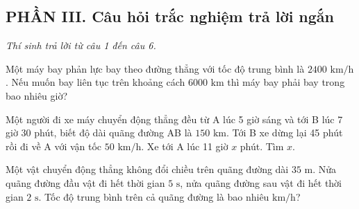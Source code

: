 \setcounter{ex}{0}
\subsection*{PHẦN III. Câu hỏi trắc nghiệm trả lời ngắn}
\textit{Thí sinh trả lời từ câu 1 đến câu 6.}

\begin{ex} Một máy bay phản lực bay theo đường thẳng với tốc độ trung bình là $2400\text{ km/h}$. Nếu muốn bay liên tục trên khoảng cách $6000\text{ km}$ thì máy bay phải bay trong bao nhiêu giờ?

\par{}
\end{ex}

\begin{ex} Một người đi xe máy chuyển động thẳng đều từ A lúc 5 giờ sáng và tới B lúc 7 giờ 30 phút, biết độ dài quãng đường AB là $150\text{ km}$. Tới B xe dừng lại 45 phút rồi đi về A với vận tốc $50\text{ km/h}$. Xe tới A lúc 11 giờ $x$ phút. Tìm $x$.

\par{}
\end{ex}

\begin{ex} Một vật chuyển động thẳng không đổi chiều trên quãng đường dài $35\text{ m}$. Nửa quãng đường đầu vật đi hết thời gian $5\text{ s}$, nửa quãng đường sau vật đi hết thời gian $2\text{ s}$. Tốc độ trung bình trên cả quãng đường là bao nhiêu $\text{km/h}$?

\par{}
\end{ex}

